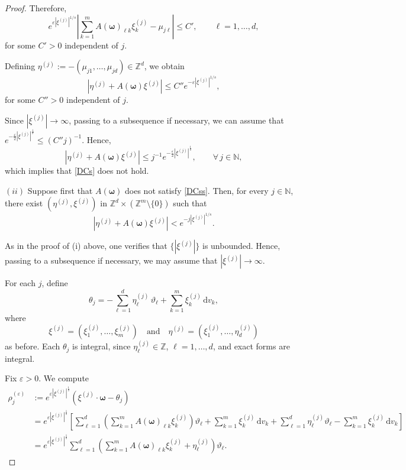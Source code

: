 \documentclass[10pt,a4paper]{amsart}
\begin{document}
\begin{proof}
	Therefore,
	\[
	e^{\varepsilon|\xi^{(j)}|^{1/s}} \left| \sum_{k=1}^{m} A(\boldsymbol{\omega})_{\ell k}\xi^{(j)}_k - \mu_{j\ell} \right| \le C', \qquad \ell=1,\dots,d,
	\]
	for some $C'>0$ independent of $j$.
	
	Defining $\eta^{(j)} := -(\mu_{j1}, \dots, \mu_{jd}) \in \mathbb{Z}^d$, we obtain
	\[
	|\eta^{(j)} + A(\boldsymbol{\omega})\xi^{(j)}| \le C'' e^{-\varepsilon|\xi^{(j)}|^{1/s}},
	\]
	for some $C''>0$ independent of $j$.
	
	Since $|\xi^{(j)}| \to \infty$, passing to a subsequence if necessary, we can assume that $e^{-\frac{\varepsilon}{2}|\xi^{(j)}|^{\frac{1}{s}}} \leq (C''j)^{-1}$. Hence,
	\[
	|\eta^{(j)} + A(\boldsymbol{\omega}) \xi^{(j)}| \leq j^{-1} e^{-\frac{\varepsilon}{2}|\xi^{(j)}|^{\frac{1}{s}}}, \qquad \forall\, j \in \mathbb{N},
	\]
	which implies that \eqref{DCs} does not hold.
	
	\medskip
	
	\noindent
	$(ii)$ Suppose first that $A(\boldsymbol{\omega})$ does not satisfy \eqref{DCss}. 
	Then, for every $j\in\mathbb{N}$, there exist  	$(\eta^{(j)},\xi^{(j)})$ in $\mathbb{Z}^d \times (\mathbb{Z}^m\setminus\{0\})$ such that
	\begin{equation}\label{not_DC_b}
		|\eta^{(j)} + A(\boldsymbol{\omega})\xi^{(j)}| 	< e^{-j|\xi^{(j)}|^{1/s}}.
	\end{equation}
	
	As in the proof of (i) above, one verifies that $\{|\xi^{(j)}|\}$ is unbounded. Hence, passing to a subsequence if necessary, we may assume that $|\xi^{(j)}|\to\infty$.
	
	For each $j$, define
	\begin{equation*}
		\theta_j = -\sum_{\ell=1}^d \eta^{(j)}_\ell\,\vartheta_\ell + \sum_{k=1}^m \xi^{(j)}_k\,\mathrm{d}v_k,
	\end{equation*}
	where
	\[\xi^{(j)}=(\xi^{(j)}_1,\dots,\xi^{(j)}_m)\quad\text{and}\quad \eta^{(j)}=(\xi^{(j)}_1,\dots,\eta^{(j)}_d)\]
	as before.	
	Each $\theta_j$ is integral, since $\eta^{(j)}_\ell\in\mathbb{Z}$, $\ell=1,\dots,d$, and exact forms are integral.
	
	
	Fix $\varepsilon>0$. We compute
	\begin{align*}
		\rho_j^{(\varepsilon)} 
		&:= e^{\varepsilon|\xi^{(j)}|^{\frac{1}{s}}} (\xi^{(j)} \cdot \boldsymbol{\omega} - \theta_j) \\
		&=
		e^{\varepsilon|\xi^{(j)}|^{\frac{1}{s}}} \left[ \sum_{\ell=1}^{d} \left(
		\sum_{k=1}^{m} A(\boldsymbol{\omega})_{\ell k}\xi^{(j)}_k \right)\vartheta_\ell
		+ \sum_{k=1}^{m}\xi^{(j)}_k\,\mathrm{d}v_k + 	\sum_{\ell=1}^{d} \eta^{(j)}_\ell\vartheta_\ell - \sum_{k=1}^{m}\xi^{(j)}_k\,\mathrm{d}v_k \right]\\
		& = e^{\varepsilon|\xi^{(j)}|^{\frac{1}{s}}} \sum_{\ell=1}^{d}
		\left( 	\sum_{k=1}^{m} A(\boldsymbol{\omega})_{\ell k}\xi^{(j)}_k + \eta^{(j)}_\ell
		\right)\vartheta_\ell. 
	\end{align*}
	

\end{proof}
\end{document}
